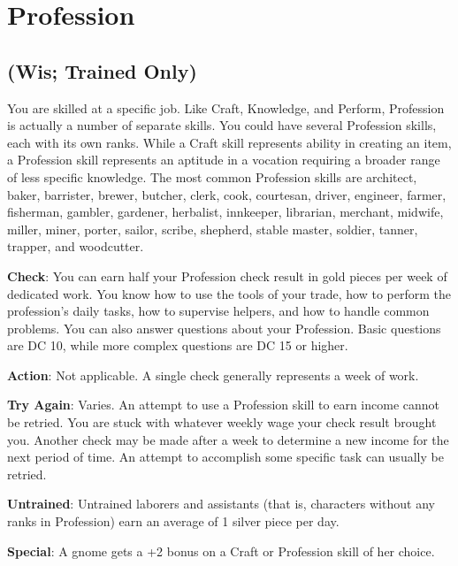 \section{Profession}

\label{f0}
\subsection{(Wis; Trained Only)}

				
You are skilled at a specific job. Like Craft, Knowledge, and Perform, Profession is actually a number of separate skills. You could have several Profession skills, each with its own ranks. While a Craft skill represents ability in creating an item, a Profession skill represents an aptitude in a vocation requiring a broader range of less specific knowledge. The most common Profession skills are architect, baker, barrister, brewer, butcher, clerk, cook, courtesan, driver, engineer, farmer, fisherman, gambler, gardener, herbalist, innkeeper, librarian, merchant, midwife, miller, miner, porter, sailor, scribe, shepherd, stable master, soldier, tanner, trapper, and woodcutter.
				
\textbf{Check}: You can earn half your Profession check result in gold pieces per week of dedicated work. You know how to use the tools of your trade, how to perform the profession's daily tasks, how to supervise helpers, and how to handle common problems. You can also answer questions about your Profession. Basic questions are DC 10, while more complex questions are DC 15 or higher.
				
\textbf{Action}: Not applicable. A single check generally represents a week of work.
				
\textbf{Try Again}: Varies. An attempt to use a Profession skill to earn income cannot be retried. You are stuck with whatever weekly wage your check result brought you. Another check may be made after a week to determine a new income for the next period of time. An attempt to accomplish some specific task can usually be retried.
				
\textbf{Untrained}: Untrained laborers and assistants (that is, characters without any ranks in Profession) earn an average of 1 silver piece per day.
				
\textbf{Special}: A gnome gets a +2 bonus on a Craft or Profession skill of her choice.
        	
